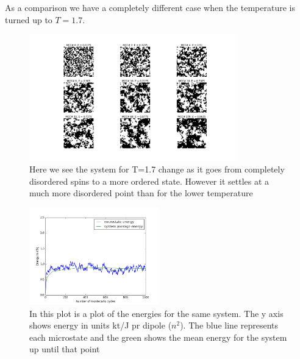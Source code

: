 \documentclass[a4paper, 12pt]{article}
\begin{document}
{	\newpage
	As a comparison we have a completely different case when the temperature is turned up to $T=1.7$.
	\begin{figure}[H]
	\begin{center}
		\includegraphics[width=0.8\textwidth]{t17_1000mcc_graphical.pdf}
		\caption{Here we see the system for T=1.7 change as it goes from completely disordered spins to a more ordered state. However it settles at a much more disordered point than for the lower temperature}
	\end{center}
	\end{figure}
	\begin{figure}[H]
	\begin{center}
		\includegraphics[width=0.5\textwidth]{t17_1000mcc_energies.png}
		\caption{In this plot is a plot of the energies for the same system. The y axis shows energy in units kt/J pr dipole ($n^2$). The blue line represents each microstate and the green shows the mean energy for the system up until that point}
	\end{center}
	\end{figure}

	\newpage
}
\end{document}
